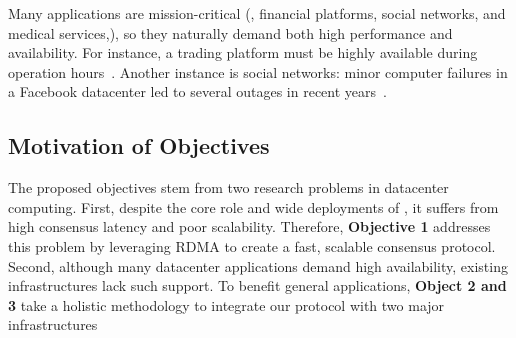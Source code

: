 Many applications are mission-critical (\eg, financial platforms, social 
networks, and medical services,), so they naturally demand both high 
performance and availability. For instance, a trading platform must be highly 
available during operation hours~\cite{nosql:finance}. Another instance is 
social networks: minor computer failures in a Facebook datacenter led to 
several outages in recent years~\cite{facebook:outage}.




% 




\vspace{-.15in}\subsection{Motivation of Objectives} 
\label{sec:motivation}\vspace{-.075in}

The proposed objectives stem from two research problems in datacenter 
computing. First, despite the core role and wide deployments of \paxos, it 
suffers from high consensus latency and poor scalability. Therefore, 
\textbf{Objective 1} addresses this problem by leveraging RDMA to create a 
fast, scalable consensus protocol. Second, although many 
datacenter applications demand high availability, existing infrastructures lack 
such support. To benefit general applications, \textbf{Object 2 and 3} take a 
holistic methodology to integrate our protocol with two major infrastructures


